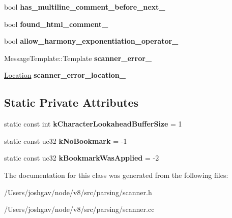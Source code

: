 \begin{DoxyCompactItemize}
\item 
bool {\bfseries has\+\_\+multiline\+\_\+comment\+\_\+before\+\_\+next\+\_\+}\hypertarget{classv8_1_1internal_1_1_scanner_a130373e9c11241ead33b3c7b9b380b06}{}\label{classv8_1_1internal_1_1_scanner_a130373e9c11241ead33b3c7b9b380b06}

\item 
bool {\bfseries found\+\_\+html\+\_\+comment\+\_\+}\hypertarget{classv8_1_1internal_1_1_scanner_a50dc1ce1f21900035c655fc91b923937}{}\label{classv8_1_1internal_1_1_scanner_a50dc1ce1f21900035c655fc91b923937}

\item 
bool {\bfseries allow\+\_\+harmony\+\_\+exponentiation\+\_\+operator\+\_\+}\hypertarget{classv8_1_1internal_1_1_scanner_ab3f9b8bf69fc35facf21686c7859d247}{}\label{classv8_1_1internal_1_1_scanner_ab3f9b8bf69fc35facf21686c7859d247}

\item 
Message\+Template\+::\+Template {\bfseries scanner\+\_\+error\+\_\+}\hypertarget{classv8_1_1internal_1_1_scanner_a856b1c6e81d8c941eb4cdbb3c3a4bc79}{}\label{classv8_1_1internal_1_1_scanner_a856b1c6e81d8c941eb4cdbb3c3a4bc79}

\item 
\hyperlink{structv8_1_1internal_1_1_scanner_1_1_location}{Location} {\bfseries scanner\+\_\+error\+\_\+location\+\_\+}\hypertarget{classv8_1_1internal_1_1_scanner_ac00156e8ceab0de2c585f39e54b73dd4}{}\label{classv8_1_1internal_1_1_scanner_ac00156e8ceab0de2c585f39e54b73dd4}

\end{DoxyCompactItemize}
\subsection*{Static Private Attributes}
\begin{DoxyCompactItemize}
\item 
static const int {\bfseries k\+Character\+Lookahead\+Buffer\+Size} = 1\hypertarget{classv8_1_1internal_1_1_scanner_ac281340d69b877aa776534db473ec52f}{}\label{classv8_1_1internal_1_1_scanner_ac281340d69b877aa776534db473ec52f}

\item 
static const uc32 {\bfseries k\+No\+Bookmark} = -\/1\hypertarget{classv8_1_1internal_1_1_scanner_a2d46136a5261958bfec5507ca47d57df}{}\label{classv8_1_1internal_1_1_scanner_a2d46136a5261958bfec5507ca47d57df}

\item 
static const uc32 {\bfseries k\+Bookmark\+Was\+Applied} = -\/2\hypertarget{classv8_1_1internal_1_1_scanner_a6ebafd496244e5283b5a6ca81ec2c929}{}\label{classv8_1_1internal_1_1_scanner_a6ebafd496244e5283b5a6ca81ec2c929}

\end{DoxyCompactItemize}


The documentation for this class was generated from the following files\+:\begin{DoxyCompactItemize}
\item 
/\+Users/joshgav/node/v8/src/parsing/scanner.\+h\item 
/\+Users/joshgav/node/v8/src/parsing/scanner.\+cc\end{DoxyCompactItemize}
